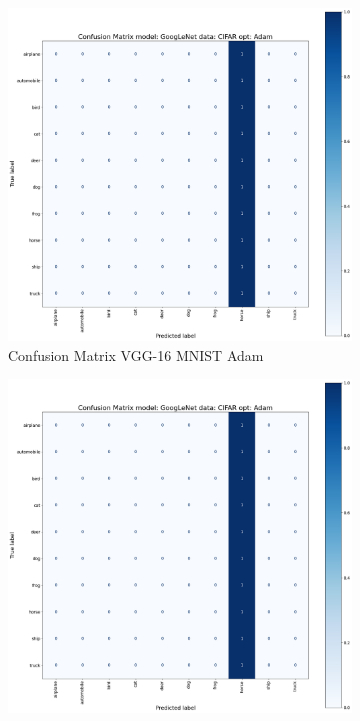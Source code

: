 \documentclass[conference]{IEEEtran}
\begin{document}
\begin{figure}[!htbp]
    \centering
    \begin{subfigure}[b]{0.22\textwidth}
        \centering
        \includegraphics[width=\textwidth]{img/matrix_sample.png}
        \caption{Confusion Matrix VGG-16 MNIST Adam}
        \label{fig:x imatrix_VGG_MNIST_Adam}
    \end{subfigure}
    \hfill
    \begin{subfigure}[b]{0.22\textwidth}
        \centering
        \includegraphics[width=\textwidth]{img/matrix_sample.png}

\end{subfigure}
\end{figure}
\end{document}
